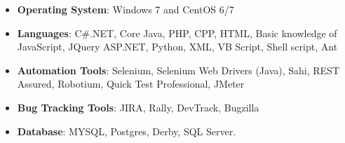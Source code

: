 \begin{cvparagraph}
\begin{itemize}
\item {\textbf{Operating System}: Windows 7 and CentOS 6/7}
\item {\textbf{Languages}: C\#.NET, Core Java, PHP, CPP, HTML, Basic knowledge of JavaScript, JQuery ASP.NET, Python, XML, VB Script, Shell script, Ant}
\item {\textbf{Automation  Tools}: Selenium, Selenium Web Drivers (Java), Sahi, REST Assured, Robotium, Quick Test Professional, JMeter}
\item {\textbf{Bug Tracking Tools}: JIRA, Rally, DevTrack, Bugzilla }
\item {\textbf{Database}: MYSQL, Postgres, Derby, SQL Server.}
\end{itemize}
\end{cvparagraph}